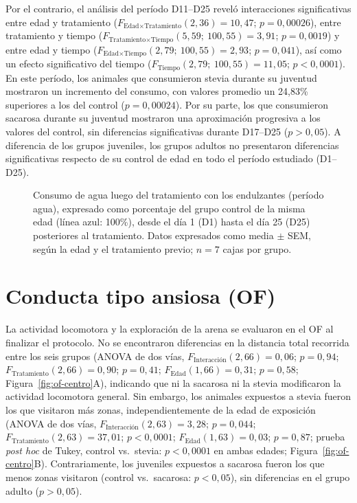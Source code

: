 Por el contrario, el análisis del período D11--D25 reveló interacciones significativas entre edad y tratamiento ($F_{\text{Edad} \times \text{Tratamiento}}(2, 36) = 10{,}47$; $p = 0{,}00026$), entre tratamiento y tiempo ($F_{\text{Tratamiento} \times \text{Tiempo}}(5{,}59;\ 100{,}55) = 3{,}91$; $p = 0{,}0019$) y entre edad y tiempo ($F_{\text{Edad} \times \text{Tiempo}}(2{,}79;\ 100{,}55) = 2{,}93$; $p = 0{,}041$), así como un efecto significativo del tiempo ($F_{\text{Tiempo}}(2{,}79;\ 100{,}55) = 11{,}05$; $p < 0{,}0001$). En este período, los animales que consumieron stevia durante su juventud mostraron un incremento del consumo, con valores promedio un 24,83\% superiores a los del control ($p = 0{,}00024$). Por su parte, los que consumieron sacarosa durante su juventud mostraron una aproximación progresiva a los valores del control, sin diferencias significativas durante D17--D25 ($p > 0{,}05$). A diferencia de los grupos juveniles, los grupos adultos no presentaron diferencias significativas respecto de su control de edad en todo el período estudiado (D1--D25).

\begin{figure}[htbp]
  \centering
  \caption[Consumo de agua luego del tratamiento con los endulzantes]{Consumo de agua luego del tratamiento con los endulzantes (período agua), expresado como porcentaje del grupo control de la misma edad (línea azul: 100\%), desde el día 1 (D1) hasta el día 25 (D25) posteriores al tratamiento. Datos expresados como media $\pm$ SEM, según la edad y el tratamiento previo; $n = 7$ cajas por grupo.}
  \label{fig:agua-lavado}
\end{figure}

\FloatBarrier
\section{Conducta tipo ansiosa (OF)}\label{sec:res-of}

\label{sec:res-of-locomocion}La actividad locomotora y la exploración de la arena se evaluaron en el OF al finalizar el protocolo. No se encontraron diferencias en la distancia total recorrida entre los seis grupos (ANOVA de dos vías, $F_{\text{Interacción}}(2, 66) = 0{,}06$; $p = 0{,}94$; $F_{\text{Tratamiento}}(2, 66) = 0{,}90$; $p = 0{,}41$; $F_{\text{Edad}}(1, 66) = 0{,}31$; $p = 0{,}58$; Figura~\ref{fig:of-centro}A), indicando que ni la sacarosa ni la stevia modificaron la actividad locomotora general. Sin embargo, los animales expuestos a stevia fueron los que visitaron más zonas, independientemente de la edad de exposición (ANOVA de dos vías, $F_{\text{Interacción}}(2, 63) = 3{,}28$; $p = 0{,}044$; $F_{\text{Tratamiento}}(2, 63) = 37{,}01$; $p < 0{,}0001$; $F_{\text{Edad}}(1, 63) = 0{,}03$; $p = 0{,}87$; prueba \textit{post hoc} de Tukey, control vs.\ stevia: $p < 0{,}0001$ en ambas edades; Figura~\ref{fig:of-centro}B). Contrariamente, los juveniles expuestos a sacarosa fueron los que menos zonas visitaron (control vs.\ sacarosa: $p < 0{,}05$), sin diferencias en el grupo adulto ($p > 0{,}05$).

